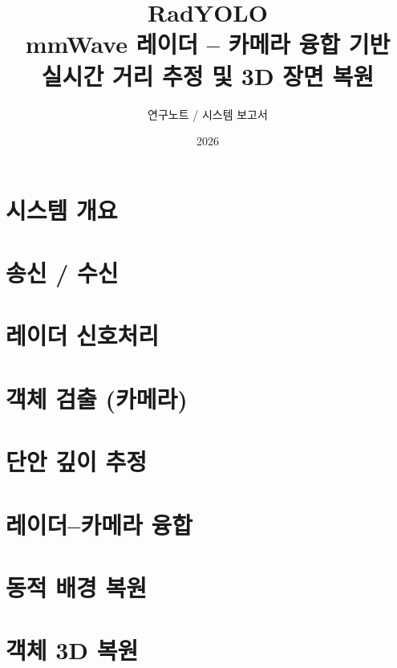 \documentclass[11pt,oneside]{book}
\title{\textbf{RadYOLO}\\[4pt]
  \large mmWave 레이더 -- 카메라 융합 기반\\ 실시간 거리 추정 및 3D 장면 복원}
\author{연구노트 / 시스템 보고서}
\date{2026}
\begin{document}
\maketitle
\tableofcontents

\part{시스템 개요}


\part{송신 / 수신}


\part{레이더 신호처리}


\part{객체 검출 (카메라)}


\part{단안 깊이 추정}


\part{레이더--카메라 융합}


\part{동적 배경 복원}


\part{객체 3D 복원}

\end{document}
